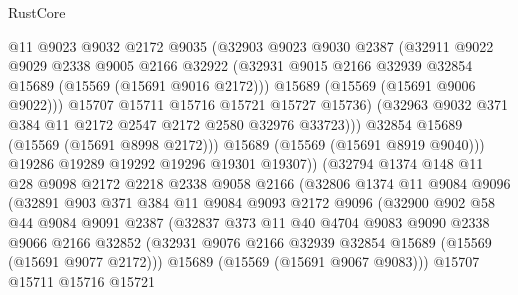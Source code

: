 \begin{lexlean}{RustCore}
\begin{coremodule}
                        @11
                        @9023
                        @9032
                        @2172
                        @9035
                        (@32903
                          @9023
                          @9030
                          @2387
                          (@32911
                            @9022
                            @9029
                            @2338
                            @9005
                            @2166
                            @32922
                            (@32931 @9015 @2166 @32939 @32854 @15689 (@15569 (@15691 @9016 @2172)))
                            @15689
                            (@15569 (@15691 @9006 @9022)))
                          @15707
                          @15711
                          @15716
                          @15721
                          @15727
                          @15736)
                        (@32963 @9032 @371 @384 @11 @2172 @2547 @2172 @2580 @32976 @33723)))
                    @32854
                    @15689
                    (@15569 (@15691 @8998 @2172)))
                  @15689
                  (@15569 (@15691 @8919 @9040)))
                @19286
                @19289
                @19292
                @19296
                @19301
                @19307))
            (@32794
              @1374
              @148
              @11
              @28
              @9098
              @2172
              @2218
              @2338
              @9058
              @2166
              (@32806
                @1374
                @11
                @9084
                @9096
                (@32891
                  @903
                  @371
                  @384
                  @11
                  @9084
                  @9093
                  @2172
                  @9096
                  (@32900
                    @902
                    @58
                    @44
                    @9084
                    @9091
                    @2387
                    (@32837
                      @373
                      @11
                      @40
                      @4704
                      @9083
                      @9090
                      @2338
                      @9066
                      @2166
                      @32852
                      (@32931 @9076 @2166 @32939 @32854 @15689 (@15569 (@15691 @9077 @2172)))
                      @15689
                      (@15569 (@15691 @9067 @9083)))
                    @15707
                    @15711
                    @15716
                    @15721

\end{coremodule}
\end{lexlean}
